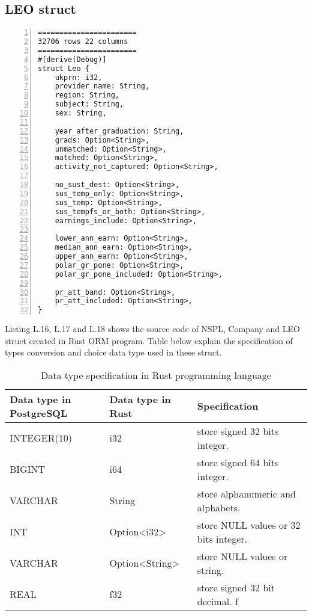 \newpage

\subsection{LEO struct}

\lstset{basicstyle=\ttfamily\tiny}  
\begin{lstlisting}[breaklines, frame=single, numbers=left, caption={Source code for LEO struct. (leo.rs)}, label=commandline-02]
=======================
32706 rows 22 columns 
=======================
#[derive(Debug)]
struct Leo {
	ukprn: i32,
	provider_name: String,
	region: String,
	subject: String,
	sex: String,
	
	year_after_graduation: String,
	grads: Option<String>,
	unmatched: Option<String>,
	matched: Option<String>,
	activity_not_captured: Option<String>,
	
	no_sust_dest: Option<String>,
	sus_temp_only: Option<String>,
	sus_temp: Option<String>,
	sus_tempfs_or_both: Option<String>,
	earnings_include: Option<String>,
	
	lower_ann_earn: Option<String>,
	median_ann_earn: Option<String>,
	upper_ann_earn: Option<String>,
	polar_gr_pone: Option<String>,
	polar_gr_pone_included: Option<String>,
	
	pr_att_band: Option<String>,
	pr_att_included: Option<String>,
}

\end{lstlisting}

Listing L.16, L.17 and L.18 shows the source code of NSPL, Company and LEO struct created in Rust ORM program.  Table below explain the specification of types conversion and choice data type used in these struct. 

\begin{table}[H]
	\centering
	\begin{tabulary}{1.0\textwidth}{|L|L|L|}
		\hline
		{\textbf{Data type in PostgreSQL}} & {\bf Data type in Rust} & {\bf Specification}  \\ \hline
		INTEGER(10)						  & i32      			  & store signed 32 bits integer.                    \\ \hline
		BIGINT	&					i64     		& store signed 64 bits integer.                     \\ \hline
		VARCHAR & String       	& store alphanumeric and alphabets.                        \\ \hline
		INT  & Option<i32>   & store NULL values or 32 bits integer.                                \\ \hline
		VARCHAR & Option<String>  & store NULL values or string.                               \\ \hline
		REAL  & f32       	& store signed 32 bit decimal.           f                       \\ \hline
	\end{tabulary}
	\caption{Data type specification in Rust programming language}
\end{table}

